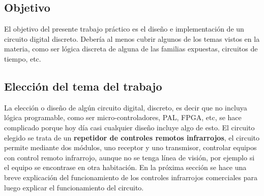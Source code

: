 \subsection{Objetivo}

El objetivo del presente trabajo práctico es el diseño e implementación de un circuito digital discreto. Debería al menos cubrir algunos de los temas vistos en la materia, como ser lógica discreta de alguna de las familias expuestas, circuitos de tiempo, etc.\\


\subsection{Elección del tema del trabajo}


La elección o diseño de algún circuito digital, discreto, es decir que no incluya lógica programable, como ser micro-controladores, PAL, FPGA, etc, se hace complicado porque hoy día casi cualquier diseño incluye algo de esto. El circuito elegido se trata de un \textbf{repetidor de controles remotos infrarrojos}, el circuito permite mediante dos módulos, uno receptor y uno transmisor, controlar equipos con control remoto infrarrojo, aunque no se tenga línea de visión, por ejemplo si el equipo se encontrase en otra habitación. En la próxima sección se hace una breve explicación del funcionamiento de los controles infrarrojos comerciales para luego explicar el funcionamiento del circuito.

